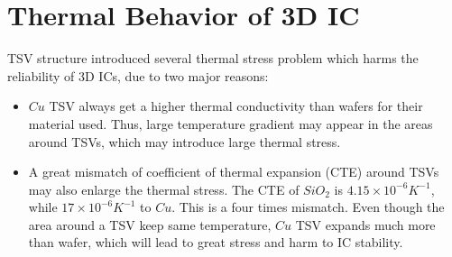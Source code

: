 \section{Thermal Behavior of 3D IC} \label{sec::thermal}
TSV structure introduced several thermal stress problem which harms the reliability of 3D ICs, due to
two major reasons:
\begin{itemize}
    \item $Cu$ TSV always get a higher thermal conductivity than wafers for their material used.
    Thus, large temperature gradient may appear in the areas around TSVs, which may
    introduce large thermal stress.
    \item A great mismatch of coefficient of thermal expansion (CTE) around TSVs may also enlarge 
    the thermal stress. The CTE of $SiO_2$ is $4.15\times10^{-6}K^{-1}$, while
    $17\times10^{-6}K^{-1}$ to $Cu$. This is a four times mismatch.
    Even though the area around a TSV keep same temperature, $Cu$ TSV expands much more than
    wafer, which will lead to great stress and harm to IC stability.
\end{itemize}

